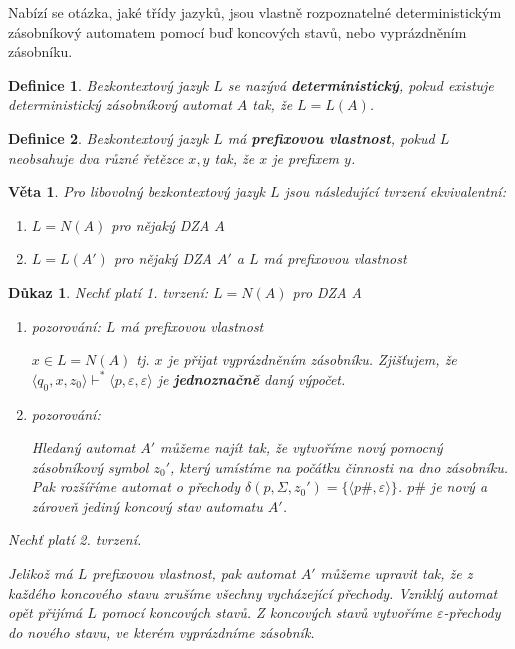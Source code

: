\documentclass[10pt, a4paper, titlepage]{article}
\theoremstyle{note}
\newtheorem{veta}{Věta}
\newtheorem{definice}{Definice}
\newtheorem{dukaz}{Důkaz}
\begin{document}
Nabízí se otázka, jaké třídy jazyků, jsou vlastně rozpoznatelné deterministickým zásobníkový automatem pomocí buď koncových stavů, nebo vyprázdněním zásobníku.

\begin{definice}
Bezkontextový jazyk $L$ se nazývá \textbf{deterministický}, pokud existuje deterministický zásobníkový automat $A$ tak, že $L = L(A)$.
\end{definice}

\begin{definice}
Bezkontextový jazyk $L$ má \textbf{prefixovou vlastnost}, pokud $L$ neobsahuje dva různé řetězce $x,y$ tak, že $x$ je prefixem $y$.
\end{definice}

\begin{veta}
Pro libovolný bezkontextový jazyk $L$ jsou následující tvrzení ekvivalentní:
\begin{enumerate}
\item
$L = N(A)$ pro nějaký DZA $A$
\item
$L = L(A')$ pro nějaký DZA $A'$ a $L$ má prefixovou vlastnost
\end{enumerate}
\end{veta}

\begin{dukaz}
Nechť platí 1. tvrzení: $L=N(A)$ \emph{pro DZA A}

\begin{enumerate}
\item
pozorování: $L$ má prefixovou vlastnost

$x \in L=N(A)$ tj. $x$ je přijat vyprázdněním zásobníku. Zjišťujem, že $\langle q_0,x,z_0 \rangle \vdash^* \langle p,\varepsilon,\varepsilon \rangle$ je \textbf{jednoznačně} daný výpočet.

\item
pozorování:

Hledaný automat $A'$ můžeme najít tak, že vytvoříme nový pomocný zásobníkový symbol $z_0'$, který umístíme na počátku činnosti na dno zásobníku. Pak rozšíříme automat o přechody $\delta (p,\Sigma,z_0') = \lbrace \langle p\#,\varepsilon \rangle \rbrace$. $p\#$ je nový a zároveň jediný koncový stav automatu $A'$.
\end{enumerate}

Nechť platí 2. tvrzení.

Jelikož má $L$ prefixovou vlastnost, pak automat $A'$ můžeme upravit tak, že z každého koncového stavu zrušíme všechny vycházející přechody. Vzniklý automat opět přijímá $L$ pomocí koncových stavů. Z koncových stavů vytvoříme $\varepsilon$-přechody do nového stavu, ve kterém vyprázdníme zásobník.
\end{dukaz}
\end{document}
